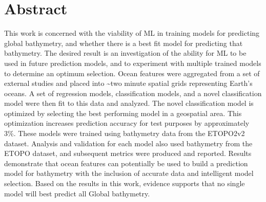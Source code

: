 \section{Abstract}
\setlength{\parindent}{10ex}
This work is concerned with the viability of \ac{ML} in training models for predicting global bathymetry, and whether there is a best fit model for predicting that bathymetry.
The desired result is an investigation of the ability for \ac{ML} to be used in future prediction models, and to experiment with multiple trained models to determine an optimum selection.
Ocean features were aggregated from a set of external studies and placed into \~{}two minute spatial grids representing Earth's oceans.
A set of regression models, classification models, and a novel classification model were then fit to this data and analyzed.
The novel classification model is optimized by selecting the best performing model in a geospatial area.
This optimization increases prediction accuracy for test purposes by approximately 3\%.
These models were trained using bathymetry data from the ETOPO2v2 dataset.
Analysis and validation for each model also used bathymetry from the ETOPO dataset, and subsequent metrics were produced and reported.
Results demonstrate that ocean features can potentially be used to build a prediction model for bathymetry with the inclusion of accurate data and intelligent model selection.
Based on the results in this work, evidence supports that no single model will best predict all Global bathymetry.